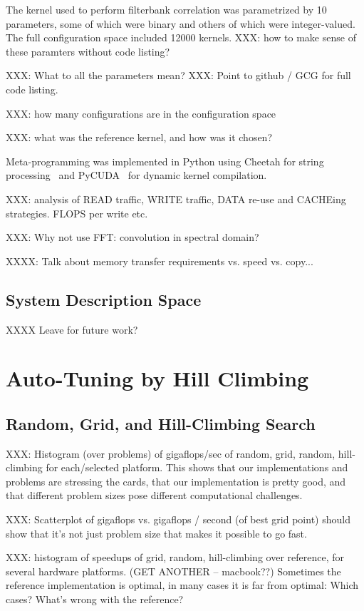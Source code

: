 \documentclass{sig-alternate}
\begin{document}
The kernel used to perform
filterbank correlation was parametrized by 10 parameters, some of which
were binary and others of which were integer-valued. The full configuration
space included 12000 kernels.
XXX: how to make sense of these paramters without code listing?

XXX: What to all the parameters mean?
XXX: Point to github / GCG for full code listing.

XXX: how many configurations are in the configuration space

XXX: what was the reference kernel, and how was it chosen?

Meta-programming was implemented in Python using
Cheetah for string processing~\citep{cheetah}
and PyCUDA~\citep{klochner+etal:2009} for dynamic kernel compilation.

XXX: analysis of READ traffic, WRITE traffic, DATA re-use and CACHEing
strategies. FLOPS per write etc.

XXX: Why not use FFT: convolution in spectral domain?

XXXX: Talk about memory transfer requirements vs. speed vs. copy... 



\subsection{System Description Space}

 XXXX Leave for future work?


\section{Auto-Tuning by Hill Climbing}

\subsection{Random, Grid, and Hill-Climbing Search}

XXX: Histogram (over problems) of gigaflops/sec of random, grid, random,
hill-climbing for each/selected platform.
This shows that our implementations and problems are stressing the cards,
that our implementation is pretty good, and that different problem sizes pose
different computational challenges.

XXX: Scatterplot of gigaflops vs. gigaflops / second (of best grid point)
should show that it's not just problem size that makes it possible to go fast.


XXX: histogram of speedups of grid, random, hill-climbing over reference, for
several hardware platforms. (GET ANOTHER -- macbook??)
Sometimes the reference implementation is optimal, in many cases it is far
from optimal: Which cases? What's wrong with the reference?
\end{document}
